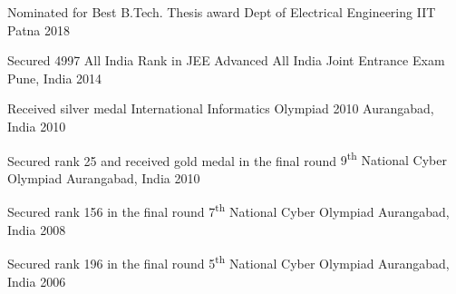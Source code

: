 
\begin{cvhonors}

\cvhonor
	{Nominated for Best B.Tech. Thesis award} %
	{Dept of Electrical Engineering} %
	{IIT Patna} %
	{2018} %

\cvhonor
	{Secured 4997 All India Rank in JEE Advanced} %
	{All India Joint Entrance Exam} %
	{Pune, India} %
	{2014} %

\cvhonor
	{Received silver medal} %
	{International Informatics Olympiad 2010} %
	{Aurangabad, India} %
	{2010} %

\cvhonor
	{Secured rank 25 and received gold medal in the final round} %
	{9\textsuperscript{th} National Cyber Olympiad} %
	{Aurangabad, India} %
	{2010} %

\cvhonor
	{Secured rank 156 in the final round} %
	{7\textsuperscript{th} National Cyber Olympiad} %
	{Aurangabad, India} %
	{2008} %

\cvhonor
	{Secured rank 196 in the final round} %
	{5\textsuperscript{th} National Cyber Olympiad} %
	{Aurangabad, India} %
	{2006} %

\end{cvhonors}
